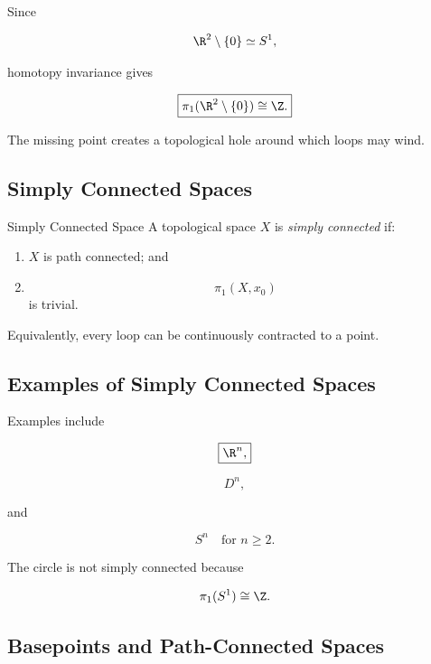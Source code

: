 Since

\[
\R^2\setminus\{0\}
\simeq
S^1,
\]

homotopy invariance gives

\[
\boxed{
\pi_1(\R^2\setminus\{0\})
\cong
\Z.
}
\]

The missing point creates a topological hole around which loops may wind.

\subsection{Simply Connected Spaces}
\label{subsec:simply-connected-spaces}

\begin{definitionbox}{Simply Connected Space}
A topological space \(X\) is \emph{simply connected} if:

\begin{enumerate}
    \item \(X\) is path connected; and
    \item
    \[
    \boxed{
    \pi_1(X,x_0)
    }
    \]
    is trivial.
\end{enumerate}
\end{definitionbox}

Equivalently, every loop can be continuously contracted to a point.

\subsection{Examples of Simply Connected Spaces}
\label{subsec:simply-connected-examples}

Examples include

\[
\boxed{
\R^n,
}
\]

\[
\boxed{
D^n,
}
\]

and

\[
\boxed{
S^n
\quad\text{for }n\geq2.
}
\]

The circle is not simply connected because

\[
\pi_1(S^1)\cong\Z.
\]

\subsection{Basepoints and Path-Connected Spaces}
\label{subsec:basepoint-fundamental-group}

